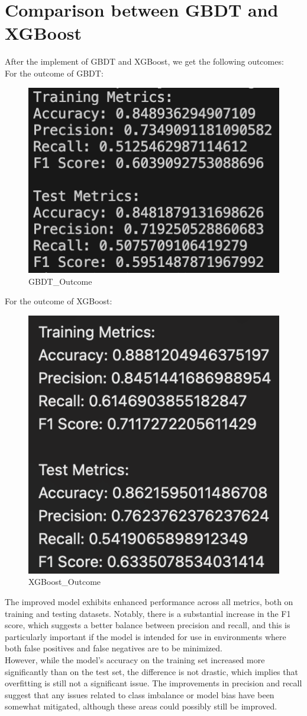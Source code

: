 \documentclass[12pt]{article}
\begin{document}
\section{Comparison between GBDT and XGBoost}
After the implement of GBDT and XGBoost, we get the following outcomes:\\
For the outcome of GBDT:
\begin{figure}[H]
    \centering
    \includegraphics[width=0.5\linewidth]{GBDT_outcome.png}
    \caption*{GBDT\_Outcome}
\end{figure}
For the outcome of XGBoost:
\begin{figure}[H]
    \centering
    \includegraphics[width=0.5\linewidth]{XGBoost_outcome.png}
    \caption*{XGBoost\_Outcome}
\end{figure}
The improved model exhibits enhanced performance across all metrics, both on training and testing datasets. Notably, there is a substantial increase in the F1 score, which suggests a better balance between precision and recall, and this is particularly important if the model is intended for use in environments where both false positives and false negatives are to be minimized.\\

However, while the model's accuracy on the training set increased more significantly than on the test set, the difference is not drastic, which implies that overfitting is still not a significant issue. The improvements in precision and recall suggest that any issues related to class imbalance or model bias have been somewhat mitigated, although these areas could possibly still be improved.\\
\end{document}
